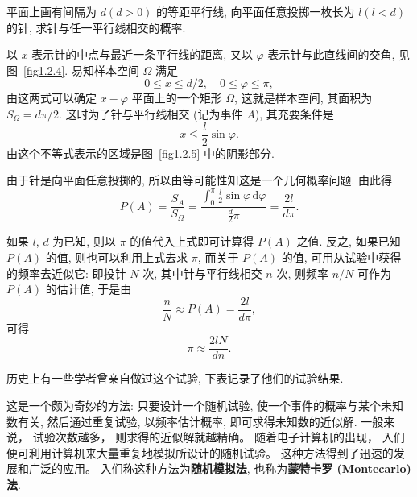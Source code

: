 \begin{example}[蒲丰投针问题]
    平面上画有间隔为 $d (d > 0)$ 的等距平行线,
    向平面任意投掷一枚长为 $l (l<d)$ 的针,
    求针与任一平行线相交的概率.
\end{example}

\begin{solution}
    以 $x$ 表示针的中点与最近一条平行线的距离,
    又以 $\varphi$ 表示针与此直线间的交角,
    见图~\ref{fig1.2.4}.
    易知样本空间 $\Omega$ 满足
    \[
        0 \le x \le d/2, \quad 0 \le \varphi \le \pi,
    \]
    由这两式可以确定 $x - \varphi$ 平面上的一个矩形 $\Omega$,
    这就是样本空间,
    其面积为 $S_\Omega = d\pi/2$.
    这时为了针与平行线相交 (记为事件 $A$),
    其充要条件是
    \[
        x \le \frac{l}{2} \sin \varphi.
    \]
    由这个不等式表示的区域是图~\ref{fig1.2.5} 中的阴影部分.

    由于针是向平面任意投掷的,
    所以由等可能性知这是一个几何概率问题.
    由此得
    \[
        P (A) = \frac{S_A}{S_\Omega}
        = \frac{\int_0^\pi \frac{l}{2} \sin \varphi \, \mathrm{d} \varphi}{\frac{d}{2} \pi}
        = \frac{2l}{d\pi}.
    \]

    如果 $l$, $d$ 为已知,
    则以 $\pi$ 的值代入上式即可计算得 $P(A)$ 之值.
    反之,
    如果已知 $P(A)$ 的值,
    则也可以利用上式去求 $\pi$,
    而关于 $P(A)$ 的值,
    可用从试验中获得的频率去近似它:
    即投针 $N$ 次,
    其中针与平行线相交 $n$ 次,
    则频率 $n/N$ 可作为 $P(A)$ 的估计值,
    于是由
    \[
        \frac{n}{N} \approx P (A) = \frac{2l}{d\pi},
    \]
    可得
    \[
        \pi \approx \frac{2lN}{dn}.
    \]

    历史上有一些学者曾亲自做过这个试验,
    下表记录了他们的试验结果.

    

    这是一个颇为奇妙的方法:
    只要设计一个随机试验,
    使一个事件的概率与某个未知数有关,
    然后通过重复试验,
    以频率估计概率,
    即可求得未知数的近似解.
    一般来说，
    试验次数越多，
    则求得的近似解就越精确。
    随着电子计算机的出现，
    入们便可利用计算机来大量重复地模拟所设计的随机试验。
    这种方法得到了迅速的发展和广泛的应用。
    入们称这种方法为\textbf{随机模拟法},
    也称为\textbf{蒙特卡罗 (Montecarlo) 法}.
\end{solution}

